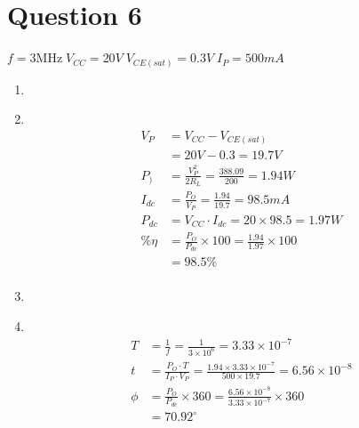 \documentclass[11pt]{article}
\newcommand\Item[1][]{%
  \ifx\relax#1\relax  \item \else \item[#1] \fi
  \abovedisplayskip=0pt\abovedisplayshortskip=0pt~\vspace*{-\baselineskip}}
\begin{document}
\section*{Question 6}
$f=3\mathrm{MHz} \; V_{CC} = 20V \; V_{CE(sat)} = 0.3V \; I_{P}=500mA$
\begin{enumerate}[label=\roman*)]
  \Item %
    \begin{align*}
      V_{P} &= V_{CC} - V_{CE(sat)} \\
      &= 20V - 0.3 = 19.7V \\
      P_{)} &= \frac{V_{P}^{2}}{2R_{L}} = \frac{388.09}{200} = 1.94W \\
      I_{dc} &= \frac{P_{O}}{V_{P}} = \frac{1.94}{19.7} = 98.5mA \\
      P_{dc} &= V_{CC}{\cdot}I_{dc} = 20 \times 98.5 = 1.97W \\
      \% \eta &= \frac{P_{O}}{P_{dc}} \times 100 = \frac{1.94}{1.97} \times 100 \\ &= 98.5\% \\ 
    \end{align*}
  \Item %
    \begin{align*}
      T &= \frac{1}{f} = \frac{1}{3{\times}10^{6}} = 3.33{\times}10^{-7} \\
      t &= \frac{P_{O}{\cdot}T}{I_{P}{\cdot}V_{P}} = \frac{1.94{\times}3.33 {\times}10^{-7}}{500{\times}19.7} = 6.56{\times}10^{-8} \\
      \phi &= \frac{P_{O}}{P_{dc}} \times 360 = \frac{6.56{\times}10^{-8}}{3.33{\times}10^{-7}} \times 360 \\ &= 70.92^{\circ}
    \end{align*}
\end{enumerate}
\end{document}
